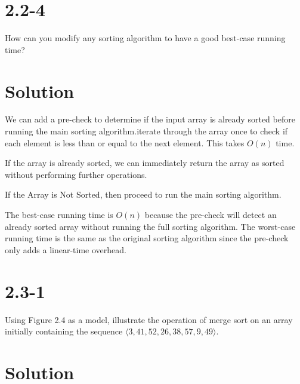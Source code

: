 \documentclass{article}
\begin{document}
\section*{2.2-4}

\text How can you modify any sorting algorithm to have a good best-case running time?

\section*{Solution}

We can add a pre-check to determine if the input array is already sorted before running the main sorting algorithm.iterate through the array once to check if each element is less than or equal to the next element. This takes $O(n)$ time.

If the array is already sorted, we can immediately return the array as sorted without performing further operations.

If the Array is Not Sorted, then proceed to run the main sorting algorithm.

The best-case running time is $O(n)$ because the pre-check will detect an already sorted array without running the full sorting algorithm.
The worst-case running time is the same as the original sorting algorithm since the pre-check only adds a linear-time overhead.


\section*{2.3-1}

\text Using Figure 2.4 as a model, illustrate the operation of merge sort on an array initially containing the sequence $\langle 3, 41, 52, 26, 38, 57, 9, 49 \rangle$.

\section*{Solution}
\end{document}
